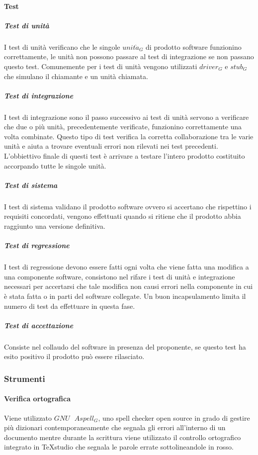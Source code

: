 		\paragraph{Test}
			\subparagraph{Test di unità} \Spazio
			I test di unità verificano che le singole $unit\grave{a}_G$ di prodotto software funzionino correttamente, le unità non possono passare al test di integrazione se non passano questo test.
			Comunemente per i test di unità vengono utilizzati $driver_G$ e $stub_G$ che simulano il chiamante e un unità chiamata.
			\subparagraph{Test di integrazione} \Spazio
			I test di integrazione sono il passo successivo ai test di unità servono a verificare che due o più unità, precedentemente verificate, funzionino correttamente una volta combinate.
			Questo tipo di test verifica la corretta collaborazione tra le varie unità e aiuta a trovare eventuali errori non rilevati nei test precedenti.
			L'obbiettivo finale di questi test è arrivare a testare l'intero prodotto costituito accorpando tutte le singole unità.
			\subparagraph{Test di sistema} \Spazio
			I test di sistema validano il prodotto software ovvero si accertano che rispettino i requisiti concordati, vengono effettuati quando si ritiene che il prodotto abbia raggiunto una versione definitiva.
			\subparagraph{Test di regressione}	\Spazio
			I test di regressione devono essere fatti ogni volta che viene fatta una modifica a una componente software, consistono nel rifare i test di unità e integrazione necessari per accertarsi che tale modifica non causi errori nella componente in cui è stata fatta o in parti del software collegate.
			Un buon incapsulamento limita il numero di test da effettuare in questa fase.				
			\subparagraph{Test di accettazione} \Spazio
			Consiste nel collaudo del software in presenza del proponente, se questo test ha esito positivo il prodotto può essere rilasciato.
	\subsubsection{Strumenti}
			\paragraph{Verifica ortografica} \Spazio
			Viene utilizzato $GNU\text{ }Aspell_G$, uno spell checker open source in grado di gestire più dizionari contemporaneamente che segnala gli errori all'interno di un documento mentre durante la scrittura viene utilizzato il controllo ortografico integrato in TeXstudio che segnala le parole errate sottolineandole in rosso.
